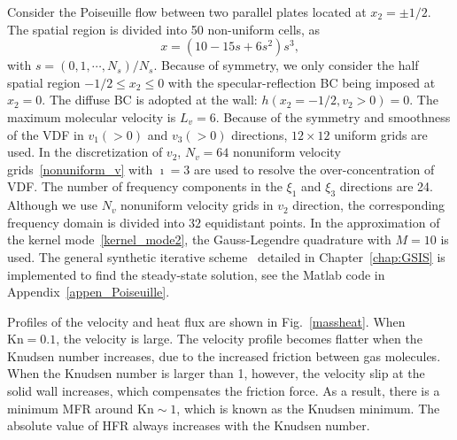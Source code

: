 Consider the Poiseuille flow between two parallel plates located at $x_2=\pm1/2$. The spatial region is divided into 50 non-uniform cells, as 
\begin{equation}\label{spatial_d}
x=(10-15s+6s^2)s^3, 
\end{equation}
with $s=(0,1,\cdots,N_s)/N_s$. Because of symmetry, we only consider the half spatial region $-1/2\le{}x_2\le0$ with the specular-reflection BC being imposed at $x_2=0$. The diffuse BC is adopted at the wall: 
$h\left(x_2=-{1}/{2},v_2>0\right)=0$. The maximum molecular velocity is $L_v=6$. Because of the symmetry and smoothness of the VDF in $v_1(>0)$ and $v_3(>0)$ directions, $12\times12$ uniform grids are used. In the discretization of $v_2$, $N_v=64$ nonuniform velocity grids~\eqref{nonuniform_v} with $\imath=3$ are used to resolve the over-concentration of VDF. The number of frequency components in the $\xi_1$ and $\xi_3$ directions are 24. Although we use $N_v$ nonuniform velocity grids in $v_2$ direction, the corresponding frequency domain is divided into $32$ equidistant points. In the approximation of the kernel mode~\eqref{kernel_mode2}, the Gauss-Legendre quadrature with $M=10$ is used. The general synthetic iterative scheme~\cite{LeiJCP2017,SuArXiv2019} detailed in Chapter~\ref{chap:GSIS} is implemented to find the steady-state solution, see the Matlab code in Appendix~\ref{appen_Poiseuille}. 



Profiles of the velocity and heat flux are shown in Fig.~\ref{massheat}. When $\text{Kn}=0.1$, the velocity is large. The velocity profile becomes flatter when the Knudsen number increases, due to the increased friction between gas molecules. When the Knudsen number is larger than 1, however, the velocity slip at the solid wall increases, which compensates the friction force. As a result, there is a minimum MFR around $\text{Kn}\sim1$, which is known as the Knudsen minimum. The absolute value of HFR always increases with the Knudsen number. 

